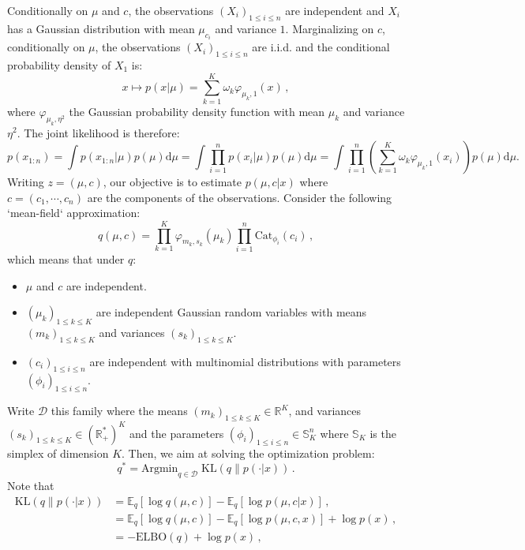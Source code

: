 \documentclass[english,graybox,envcountchap,envcountsame,sectrefs,shortlabels]{svmono}
\theoremstyle{style}
\newcommand{\eqsp}{}
\begin{document}
Conditionally on  $\mu$ and $c$, the observations $(X_i)_{1\leqslant i\leqslant n}$ are independent and $X_i$ has a Gaussian distribution with mean $\mu_{c_i}$ and variance $1$. Marginalizing on $c$, conditionally on  $\mu$, the observations $(X_i)_{1\leqslant i\leqslant n}$ are i.i.d. and the conditional probability density of $X_1$ is:
$$
x\mapsto p(x|\mu) = \sum_{k=1}^K \omega_k \varphi_{\mu_k,1}(x)\,,
$$
where $\varphi_{\mu_k,\eta^2}$ the Gaussian probability density function with mean $\mu_k$ and  variance $\eta^2$. The joint likelihood is therefore:
$$
p(x_{1:n}) = \int p(x_{1:n}|\mu) p(\mu) \mathrm{d} \mu = \int \prod_{i=1}^n p(x_i|\mu) p(\mu) \mathrm{d} \mu = \int \prod_{i=1}^n \left(\sum_{k=1}^K \omega_k \varphi_{\mu_k,1}(x_i)\right) p(\mu) \mathrm{d} \mu\eqsp.
$$
Writing $z = (\mu,c)$, our objective is to estimate $p(\mu,c|x)$ where $c = (c_1,\cdots,c_n)$ are the components of the observations. Consider the following `mean-field` approximation:
$$
q(\mu,c) = \prod_{k=1}^K \varphi_{m_k,s_k}(\mu_k)\prod_{i=1}^n \mathrm{Cat}_{\phi_i}(c_i)\,, 
$$
which means that under $q$:
\begin{itemize}
\item $\mu$ and  $c$ are independent.
\item $(\mu_{k})_{1\leqslant k \leqslant K}$ are independent Gaussian random variables with means $(m_{k})_{1\leqslant k \leqslant K}$ and variances $(s_{k})_{1\leqslant k \leqslant K}$.
\item $(c_{i})_{1\leqslant i \leqslant n}$ are independent with  multinomial distributions with parameters  $(\phi_i)_{1\leqslant i \leqslant n}$.%
\end{itemize}
Write $\mathcal{D}$ this family where the means $(m_{k})_{1\leqslant k \leqslant K}\in \mathbb{R}^K$, and variances $(s_{k})_{1\leqslant k \leqslant K}\in (\mathbb{R}_+^*)^K$ and the parameters  $(\phi_i)_{1\leqslant i \leqslant n}\in \mathbb{S}_K^n$ where $\mathbb{S}_K$ is the simplex of dimension $K$.  Then, we aim at solving the optimization problem:
$$
q^* = \mathrm{Argmin}_{q\in\mathcal{D}}\; \mathrm{KL}\left(q\|p(\cdot|x)\right)\,.
$$
Note that
\begin{align*}
\mathrm{KL}\left(q\|p(\cdot|x)\right) &= \mathbb{E}_q[\log q(\mu,c)] - \mathbb{E}_q[\log p(\mu,c|x)]\,,\\
 &= \mathbb{E}_q[\log q(\mu,c)] - \mathbb{E}_q[\log p(\mu,c,x)]+\log p(x)\,,\\
&= -\mathrm{ELBO}(q)+\log p(x)\,,
\end{align*}
\end{document}
